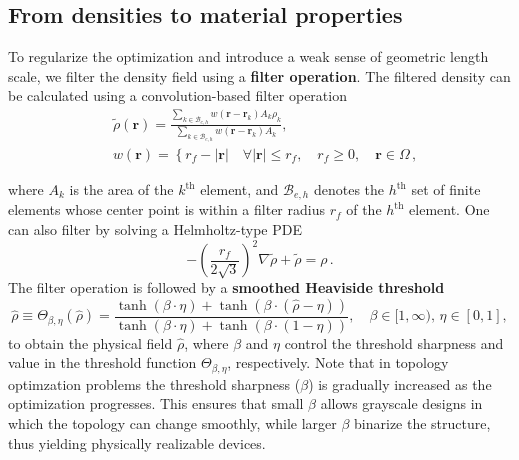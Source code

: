     \subsection*{From densities to material properties}
    To regularize the optimization and introduce a weak sense of geometric length
    scale, we filter
    the density field using a \textbf{filter operation}. The filtered density can
    be calculated using a
    convolution-based filter operation~\cite{projection}
    \begin{equation}
        \begin{aligned}
             & \tilde{\rho}(\mathbf{r})=\frac{\sum_{k \in \mathcal{B}_{e, h}}
                w\left(\mathbf{r}-\mathbf{r}_k\right) A_k \rho_k}{\sum_{k \in \mathcal{B}_{e,
            h}} w\left(\mathbf{r}-\mathbf{r}_k\right) A_k},                              \\
             & w(\mathbf{r})=\left\{r_f-|\mathbf{r}| \quad \forall|\mathbf{r}| \leq r_f,
            \quad r_f \geq 0, \quad \mathbf{r} \in \Omega\right.\,,
        \end{aligned}
    \end{equation}

    where $A_k$ is the area of the $k^\text{th}$ element, and $\mathcal{B}_{e, h}$ denotes
    the
$h^\text{th}$ set of finite elements whose center point is within a filter
    radius $r_f$ of the
$h^\text{th}$ element. One can also filter by solving a Helmholtz-type
    PDE~\cite{PDE_filter}
    \begin{equation}
        -\left(\frac{r_f}{2 \sqrt{3}}\right)^2 \nabla
        \tilde{\rho}+\tilde{\rho}=\rho\,.
    \end{equation}
    The filter operation is followed by a \textbf{smoothed Heaviside
        threshold}~\cite{projection}
    \begin{equation}\label{eq:threshold}
        \hat{\rho} \equiv \Theta_{\beta,\eta}(\hat{\rho}) =\frac{\tanh (\beta \cdot \eta)+\tanh (\beta
            \cdot(\hat{\rho}-\eta))}{\tanh (\beta \cdot \eta)+\tanh (\beta \cdot(1-\eta))},
        \quad \beta \in[1, \infty),\, \eta \in[0,1],
    \end{equation}
    to obtain the physical field $\hat{\rho}$, where $\beta$ and $\eta$ control the threshold sharpness and value in the 
    threshold function $\Theta_{\beta,\eta}$,
    respectively. Note that in topology optimzation problems the  threshold sharpness ($\beta$) is gradually increased as the optimization progresses. This ensures that
    small $\beta$ allows grayscale designs in which the topology can change smoothly, while larger
    $\beta$ binarize the structure, thus yielding physically realizable devices.
    
